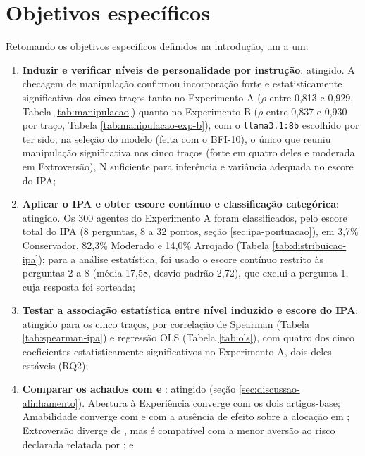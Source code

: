 \section{Objetivos específicos}

Retomando os objetivos específicos definidos na introdução, um a um:

\begin{enumerate}
    \item \textbf{Induzir e verificar níveis de personalidade por
    instrução}: atingido. A checagem de manipulação confirmou incorporação
    forte e estatisticamente significativa dos cinco traços tanto no
    Experimento A ($\rho$ entre 0,813 e 0,929, Tabela \ref{tab:manipulacao})
    quanto no Experimento B ($\rho$ entre 0,837 e 0,930 por traço, Tabela
    \ref{tab:manipulacao-exp-b}), com o \texttt{llama3.1:8b} escolhido por
    ter sido, na seleção do modelo (feita com o BFI-10), o único que
    reuniu manipulação significativa nos cinco traços (forte em quatro
    deles e moderada em Extroversão), N suficiente para inferência e
    variância adequada no escore do IPA;
    \item \textbf{Aplicar o IPA e obter escore contínuo e classificação
    categórica}: atingido. Os 300 agentes do Experimento A foram
    classificados, pelo escore total do IPA (8 perguntas, 8 a 32 pontos,
    seção \ref{sec:ipa-pontuacao}), em 3,7\% Conservador, 82,3\%
    Moderado e 14,0\% Arrojado (Tabela \ref{tab:distribuicao-ipa}); para a
    análise estatística, foi usado o escore contínuo restrito às
    perguntas 2 a 8 (média 17,58, desvio padrão 2,72), que exclui a
    pergunta 1, cuja resposta foi sorteada;
    \item \textbf{Testar a associação estatística entre nível induzido e
    escore do IPA}: atingido para os cinco traços, por correlação de
    Spearman (Tabela \ref{tab:spearman-ipa}) e regressão OLS (Tabela
    \ref{tab:ols}), com quatro dos cinco coeficientes estatisticamente
    significativos no Experimento A, dois deles estáveis (RQ2);
    \item \textbf{Comparar os achados com  e
    }: atingido (seção
    \ref{sec:discussao-alinhamento}). Abertura à Experiência converge com
    os dois artigos-base; Amabilidade converge com
     e com a ausência de efeito sobre a alocação
    em ; Extroversão diverge de
    , mas é compatível com a menor aversão ao
    risco declarada relatada por ; e

\end{enumerate}
